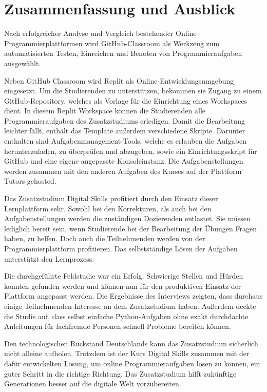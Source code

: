 \section{Zusammenfassung und Ausblick}\label{zusammenfassung-u-ausblick}
Nach erfolgreicher Analyse und Vergleich bestehender
Online-Programmierplattformen wird GitHub-Classroom als Werkzeug zum
automatisierten Testen, Einreichen und Benoten von Programmieraufgaben
ausgewählt.

Neben GitHub Classroom wird Replit als Online-Entwicklungsumgebung eingesetzt.
Um die Studierenden zu unterstützen, bekommen sie Zugang zu einem
GitHub-Repository, welches als Vorlage für die Einrichtung eines Workspaces
dient. In diesem Replit Workspace können die Studierenden alle
Programmieraufgaben des Zusatzstudiums erledigen. Damit die Bearbeitung leichter
fällt, enthält das Template außerdem verschiedene Skripte. Darunter enthalten
sind Aufgabenmanagement-Tools, welche es erlauben die Aufgaben herunterzuladen,
zu überprüfen und abzugeben, sowie ein Einrichtungsskript für GitHub und eine
eigene angepasste Konsoleinstanz. Die Aufgabenstellungen werden zusammen mit den
anderen Aufgaben des Kurses auf der Plattform Tutors gehosted.

Das Zusatzstudium Digital Skills profitiert durch den Einsatz dieser
Lernplattform sehr. Sowohl bei den Korrekturen, als auch bei den 
Aufgabenstellungen werden die zuständigen Dozierenden entlastet. Sie müssen
lediglich bereit sein, wenn Studierende bei der Bearbeitung der Übungen Fragen
haben, zu helfen. Doch auch die Teilnehmenden werden von der
Programmierplattform profitieren. Das selbstständige Lösen der Aufgaben
unterstützt den Lernprozess.

Die durchgeführte Feldstudie war ein Erfolg. Schwierige Stellen und Hürden
konnten gefunden werden und können nun für den produktiven Einsatz der Plattform
angepasst werden. Die Ergebnisse des Interviews zeigten, dass durchaus einige
Teilnehmenden Interesse an dem Zusatzstudium haben. Außerdem deckte die Studie
auf, dass selbst einfache Python-Aufgaben ohne exakt durchdachte Anleitungen
für fachfremde Personen schnell Probleme bereiten können.

Den technologischen Rückstand Deutschlands kann das Zusatzstudium sicherlich
nicht alleine aufholen. Trotzdem ist der Kurs Digital Skills zusammen mit der
dafür entwickelten Lösung, um online Programmieraufgaben lösen zu können, ein
guter Schritt in die richtige Richtung. Das Zusatzstudium hilft zukünftige
Generationen besser auf die digitale Welt vorzubereiten.